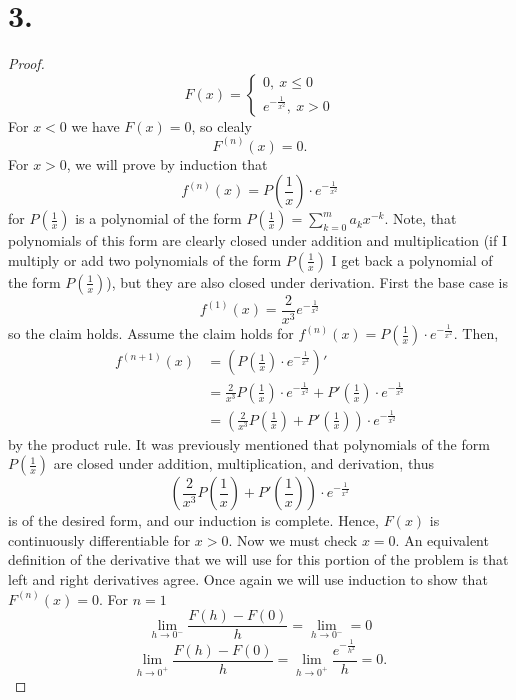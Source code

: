 \documentclass{article}
\begin{document}
\section*{3.}
\begin{proof}
  \[
  F(x) = \begin{cases}
    0, \ x \leq 0 \\
    e^{-\frac{1}{x^2}}, \ x > 0
  \end{cases}  
  \]
  For $x < 0$ we have $F(x) = 0$, so clealy \[F^{(n)}(x) = 0.\]
  For $x > 0$, we will prove by induction that 
  \[
  f^{(n)}(x) = P\left(\frac{1}{x}\right)\cdot e^{-\frac{1}{x^2}}  
  \]
  for $P\left(\frac{1}{x}\right)$ is a polynomial of the form $P\left(\frac{1}{x} \right) = \sum\limits_{k = 0}^m a_kx^{-k}$. Note, that polynomials of this form are clearly closed under addition and multiplication (if I multiply or add two polynomials of the form $P\left(\frac{1}{x}\right)$ I get back a polynomial of the form $P\left(\frac{1}{x}\right)$), but they are also closed under derivation. First the base case is \[
  f^{(1)}(x) = \frac{2}{x^3}e^{-\frac{1}{x^2}}  
  \]
  so the claim holds. Assume the claim holds for $f^{(n)}(x) = P\left(\frac{1}{x}\right)\cdot e^{-\frac{1}{x^2}}$. Then, 
  \begin{align*}
    f^{(n + 1)}(x) &= \left(P\left(\frac{1}{x}\right)\cdot e^{-\frac{1}{x^2}}\right)'\\
    &= \frac{2}{x^3}P\left(\frac{1}{x}\right)\cdot e^{-\frac{1}{x^2}} + P'\left(\frac{1}{x}\right)\cdot e^{-\frac{1}{x^2}} \\
    &= \left(\frac{2}{x^3}P\left(\frac{1}{x} \right) + P'\left(\frac{1}{x}\right)\right)\cdot e^{-\frac{1}{x^2}}
  \end{align*}
  by the product rule. It was previously mentioned that polynomials of the form $P\left(\frac{1}{x}\right)$ are closed under addition, multiplication, and derivation, thus \[
    \left(\frac{2}{x^3}P\left(\frac{1}{x} \right) + P'\left(\frac{1}{x}\right)\right)\cdot e^{-\frac{1}{x^2}}
  \]
  is of the desired form, and our induction is complete. Hence, $F(x)$ is continuously differentiable for $x > 0$. Now we must check $x = 0$. An equivalent definition of the derivative that we will use for this portion of the problem is that left and right derivatives agree. Once again we will use induction to show that $F^{(n)}(x) = 0$. For $n = 1$
  \[
  \lim\limits_{h \to 0^-} \frac{F(h) - F(0)}{h} = \lim\limits_{h \to 0^-} = 0   
  \] 
  \[
  \lim\limits_{h \to 0^+}\frac{F(h) - F(0)}{h} = \lim\limits_{h \to 0^+}\frac{e^{-\frac{1}{h^2}}}{h} = 0.  
\]
\end{proof}
\end{document}
